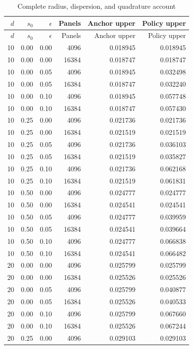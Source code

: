 \begin{longtable}{rrrrrr}
\caption{Complete radius, dispersion, and quadrature account}\label{tab:r10allbounds}\\
\toprule
$d$ & $s_0$ & $\epsilon$ & Panels & Anchor upper & Policy upper\\
\midrule\endfirsthead
\toprule
$d$ & $s_0$ & $\epsilon$ & Panels & Anchor upper & Policy upper\\
\midrule\endhead
10 & 0.00 & 0.00 & 4096 & 0.018945 & 0.018945\\
10 & 0.00 & 0.00 & 16384 & 0.018747 & 0.018747\\
10 & 0.00 & 0.05 & 4096 & 0.018945 & 0.032498\\
10 & 0.00 & 0.05 & 16384 & 0.018747 & 0.032240\\
10 & 0.00 & 0.10 & 4096 & 0.018945 & 0.057748\\
10 & 0.00 & 0.10 & 16384 & 0.018747 & 0.057430\\
10 & 0.25 & 0.00 & 4096 & 0.021736 & 0.021736\\
10 & 0.25 & 0.00 & 16384 & 0.021519 & 0.021519\\
10 & 0.25 & 0.05 & 4096 & 0.021736 & 0.036103\\
10 & 0.25 & 0.05 & 16384 & 0.021519 & 0.035827\\
10 & 0.25 & 0.10 & 4096 & 0.021736 & 0.062168\\
10 & 0.25 & 0.10 & 16384 & 0.021519 & 0.061831\\
10 & 0.50 & 0.00 & 4096 & 0.024777 & 0.024777\\
10 & 0.50 & 0.00 & 16384 & 0.024541 & 0.024541\\
10 & 0.50 & 0.05 & 4096 & 0.024777 & 0.039959\\
10 & 0.50 & 0.05 & 16384 & 0.024541 & 0.039664\\
10 & 0.50 & 0.10 & 4096 & 0.024777 & 0.066838\\
10 & 0.50 & 0.10 & 16384 & 0.024541 & 0.066482\\
20 & 0.00 & 0.00 & 4096 & 0.025799 & 0.025799\\
20 & 0.00 & 0.00 & 16384 & 0.025526 & 0.025526\\
20 & 0.00 & 0.05 & 4096 & 0.025799 & 0.040877\\
20 & 0.00 & 0.05 & 16384 & 0.025526 & 0.040533\\
20 & 0.00 & 0.10 & 4096 & 0.025799 & 0.067660\\
20 & 0.00 & 0.10 & 16384 & 0.025526 & 0.067244\\
20 & 0.25 & 0.00 & 4096 & 0.029103 & 0.029103\\

\end{longtable}
